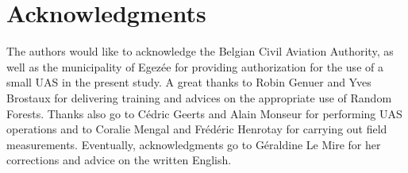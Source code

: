 \documentclass[remotesensing,article,submit,moreauthors,pdftex,12pt,a4paper]{mdpi} %
\begin{document}
\section*{\noindent Acknowledgments}
\vspace{12pt}

The authors would like to acknowledge the Belgian Civil Aviation Authority, as well as the municipality of Egezée for providing authorization for the use of a small UAS in the present study. A great thanks to Robin Genuer and Yves Brostaux for delivering training and advices on the appropriate use of Random Forests. Thanks also go to C\'edric Geerts and Alain Monseur for performing UAS operations and to Coralie Mengal and Fr\'ed\'eric Henrotay for carrying out field measurements. Eventually, acknowledgments go to G\'eraldine Le Mire %
for her corrections and advice on the written English.


\makeatletter
\renewcommand\@biblabel[1]{#1. }
\makeatother


\end{document}
